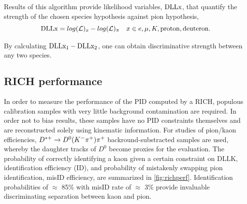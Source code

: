 Results of this algorithm provide likelihood variables, $\rm{\textrm{DLL{x}}}$, that quantify the strength of the chosen species hypothesis against pion hypothesis,
\begin{equation}
	\textrm{\textrm{DLL{x}}} = log(\mathcal{L})_{x} - log(\mathcal{L})_{\pi} \quad  x\in{e, \mu, K, \rm{proton, deuteron}}.
\end{equation}

By calculating $\rm{DLL{x_{1}} - DLL{x_{2}}}$, one can obtain discriminative strength between any two species.

\subsection{RICH performance }
\label{RICHperf}
In order to measure the performance of the \Gls{PID} computed by a \gls{RICH}, populous calibration samples with very little background contamination are required. In order not to bias results, these samples have no \Gls{PID} constraints themselves and are reconstructed solely using kinematic information. For studies of pion/kaon efficiencies, $D^{*+} \rightarrow D^{0}({K}^{-}{{\pi}^+}){{\pi}^+}$ backround-substracted samples are used, whereby the daughter tracks of $D^{0}$ become proxies for the evaluation. The probability of correctly identifying a kaon given a certain constraint on $\textrm{DLL{K}}$, identification efficiency (\Gls{ID}), and probability of mistakenly swapping pion identification, \gls{misID} efficiency, are summarized in \autoref{fig:richperf}. Identification probabilities of $\approx$ 85\% with \gls{misID} rate of $\approx$ 3\% provide invaluable discriminating separation between kaon and pion.




